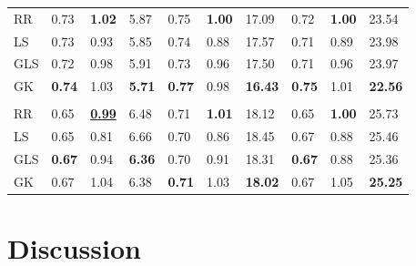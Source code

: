 \begin{refsection}
\begin{table}
\begin{tabular}{llllllllll}
\hspace{1em}RR & 0.73 & \textbf{1.02} & 5.87 & 0.75 & \textbf{1.00} & 17.09 & 0.72 & \textbf{1.00} & 23.54\\
\hspace{1em}LS & 0.73 & 0.93 & 5.85 & 0.74 & 0.88 & 17.57 & 0.71 & 0.89 & 23.98\\
\hspace{1em}GLS & 0.72 & 0.98 & 5.91 & 0.73 & 0.96 & 17.50 & 0.71 & 0.96 & 23.97\\
\hspace{1em}GK & \textbf{0.74} & 1.03 & \textbf{5.71} & \textbf{0.77} & 0.98 & \textbf{16.43} & \textbf{0.75} & 1.01 & \textbf{22.56}\\
\addlinespace[0.3em]
\multicolumn{10}{l}{\textbf{IBD}}\\
\hspace{1em}RR & 0.65 & \underline{\textbf{0.99}} & 6.48 & 0.71 & \textbf{1.01} & 18.12 & 0.65 & \textbf{1.00} & 25.73\\
\hspace{1em}LS & 0.65 & 0.81 & 6.66 & 0.70 & 0.86 & 18.45 & 0.67 & 0.88 & 25.46\\
\hspace{1em}GLS & \textbf{0.67} & 0.94 & \textbf{6.36} & 0.70 & 0.91 & 18.31 & \textbf{0.67} & 0.88 & 25.36\\
\hspace{1em}GK & 0.67 & 1.04 & 6.38 & \textbf{0.71} & 1.03 & \textbf{18.02} & 0.67 & 1.05 & \textbf{25.25}\\
\bottomrule
\end{tabular}
\end{table}

\section{Discussion}\label{discussion}


\end{refsection}
